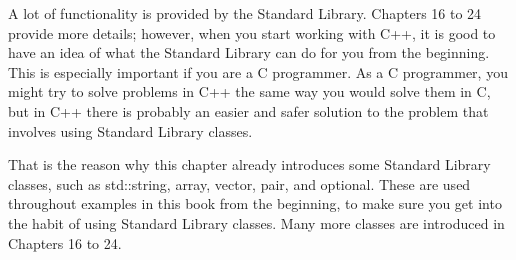 A lot of functionality is provided by the Standard Library. Chapters 16 to 24 provide more details; however, when you start working with C++, it is good to have an idea of what the Standard Library can do for you from the beginning. This is especially important if you are a C programmer. As a C programmer, you might try to solve problems in C++ the same way you would solve them in C, but in C++ there is probably an easier and safer solution to the problem that involves using Standard Library classes.

That is the reason why this chapter already introduces some Standard Library classes, such as std::string, array, vector, pair, and optional. These are used throughout examples in this book from the beginning, to make sure you get into the habit of using Standard Library classes. Many more classes are introduced in Chapters 16 to 24.






